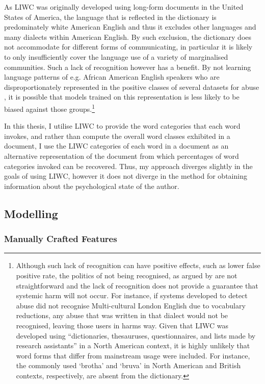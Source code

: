 As LIWC was originally developed using long-form documents in the United States of America, the language that is reflected in the dictionary is predominately white American English and thus it excludes other languages and many dialects within American English. By such exclusion, the dictionary does not accommodate for different forms of communicating, in particular it is likely to only insufficiently cover the language use of a variety of marginalised communities. Such a lack of recognition however has a benefit. By not learning language patterns of e.g. African American English speakers who are disproportionately represented in the positive classes of several datasets for abuse \citep{Waseem:2018,Davidson:2019}, it is possible that models trained on this representation is less likely to be biased against those groups.\footnote{Although such lack of recognition can have positive effects, such as lower false positive rate, the politics of not being recognised, as argued by \citet{Benjamin:2019} are not straightforward and the lack of recognition does not provide a guarantee that systemic harm will not occur. For instance, if systems developed to detect abuse did not recognise Multi-cultural London English due to vocabulary reductions, any abuse that was written in that dialect would not be recognised, leaving those users in harms way. Given that LIWC was developed using ``dictionaries, thesauruses, questionnaires, and lists made by research assistants'' \citep{Tauscik:2010} in a North American context, it is highly unlikely that word forms that differ from mainstream usage were included. For instance, the commonly used `brotha' and `bruva' in North American and British contexts, respectively, are absent from the dictionary.}
\vspace{5mm}

In this thesis, I utilise LIWC to provide the word categories that each word invokes, and rather than compute the overall word classes exhibited in a document, I use the LIWC categories of each word in a document as an alternative representation of the document from which percentages of word categories invoked can be recovered. Thus, my approach diverges slightly in the goals of using LIWC, however it does not diverge in the method for obtaining information about the psychological state of the author.

\subsection{Modelling}
\subsubsection{Manually Crafted Features}


